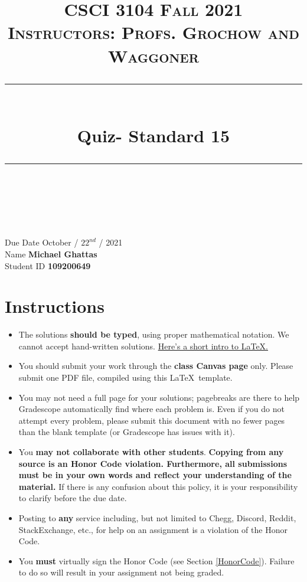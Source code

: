 \documentclass[11pt]{article}
\title{
\normalfont \normalsize 
\textsc{CSCI 3104 Fall 2021 \\ 
Instructors: Profs. Grochow and Waggoner} \\
[10pt] 
\rule{\linewidth}{0.5pt} \\[6pt] 
\huge Quiz- Standard 15 \\
\rule{\linewidth}{2pt}  \\[10pt]
}
\date{}
\theoremstyle{definition}
\theoremstyle{definition}
\theoremstyle{definition}
\begin{document}

\maketitle


\noindent
Due Date \dotfill October / $22^{nd}$ / 2021 \\
Name \dotfill \textbf{Michael Ghattas} \\
Student ID \dotfill \textbf{109200649} \\


\tableofcontents

\section{Instructions}
 \begin{itemize}
	\item The solutions \textbf{should be typed}, using proper mathematical notation. We cannot accept hand-written solutions. \href{http://ece.uprm.edu/~caceros/latex/introduction.pdf}{Here's a short intro to \LaTeX.}
	\item You should submit your work through the \textbf{class Canvas page} only. Please submit one PDF file, compiled using this \LaTeX \ template.
	\item You may not need a full page for your solutions; pagebreaks are there to help Gradescope automatically find where each problem is. Even if you do not attempt every problem, please submit this document with no fewer pages than the blank template (or Gradescope has issues with it).

	\item You \textbf{may not collaborate with other students}. \textbf{Copying from any source is an Honor Code violation. Furthermore, all submissions must be in your own words and reflect your understanding of the material.} If there is any confusion about this policy, it is your responsibility to clarify before the due date. 

	\item Posting to \textbf{any} service including, but not limited to Chegg, Discord, Reddit, StackExchange, etc., for help on an assignment is a violation of the Honor Code.

	\item You \textbf{must} virtually sign the Honor Code (see Section \ref{HonorCode}). Failure to do so will result in your assignment not being graded.
\end{itemize}
\end{document}

